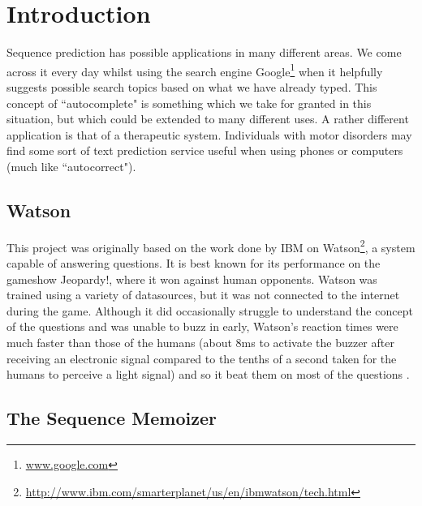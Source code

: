 \chapter{Introduction}


Sequence prediction has possible applications in many different areas. We come across it every day whilst using the search engine Google\footnote{\url{www.google.com}} when it helpfully suggests possible search topics based on what we have already typed. This concept of ``autocomplete" is something which we take for granted in this situation, but which could be extended to many different uses. A rather different application is that of a therapeutic system. Individuals with motor disorders may find some sort of text prediction service useful when using phones or computers (much like ``autocorrect").   

\section{Watson}

This project was originally based on the work done by IBM on Watson\footnote{\url{http://www.ibm.com/smarterplanet/us/en/ibmwatson/tech.html}}, a system capable of answering questions. It is best known for its performance on the gameshow Jeopardy!, where it won against human opponents. Watson was trained using a variety of datasources, but it was not connected to the internet during the game. Although it did occasionally struggle to understand the concept of the questions and was unable to buzz in early, Watson's reaction times were much faster than those of the humans (about 8ms to activate the buzzer after receiving an electronic signal compared to the tenths of a second taken for the humans to perceive a light signal) and so it beat them on most of the questions \cite{wiki_watson}.

\section{The Sequence Memoizer}

